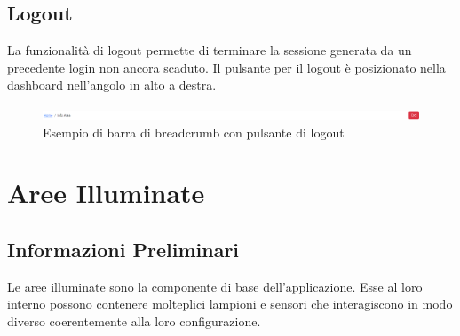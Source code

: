 \documentclass[a4paper, 12pt]{article}
\begin{document}
\subsection{Logout}
La funzionalità di logout permette di terminare la sessione generata da un precedente login non ancora scaduto. Il pulsante per il logout è posizionato nella dashboard nell'angolo in alto a destra.
\begin{figure}[H]
    \centering
    \includegraphics[width=\textwidth]{EsempioBreadcrumbConEsci}
    \caption{Esempio di barra di breadcrumb con pulsante di logout}
\end{figure}

\newpage
\section{Aree Illuminate}
\subsection{Informazioni Preliminari}
Le aree illuminate sono la componente di base dell'applicazione. Esse al loro interno possono contenere molteplici lampioni e sensori che interagiscono in modo diverso coerentemente alla loro configurazione.
\end{document}
